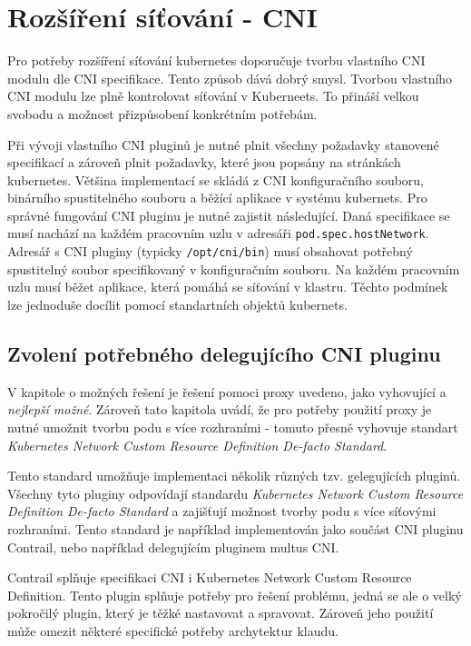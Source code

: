 \section{Rozšíření síťování - CNI}
Pro potřeby rozšíření síťování kubernetes doporučuje tvorbu vlastního CNI modulu dle CNI specifikace. Tento způsob dává dobrý smysl. Tvorbou vlastního CNI modulu lze plně kontrolovat síťování v Kuberneets. To přináší velkou svobodu a možnost přizpůsobení konkrétním potřebám.

Při vývoji vlastního CNI pluginů je nutné plnit všechny požadavky stanovené specifikací a zároveň plnit požadavky, které jsou popsány na stránkách kubernetes. Většina implementací se skládá z CNI konfiguračního souboru, binárního spustitelného souboru a běžící aplikace v systému kubernets. Pro správné fungování CNI pluginu je nutné zajistit následující. Daná specifikace se musí nachází na každém pracovním uzlu v adresáři \verb|pod.spec.hostNetwork|. Adresář s CNI pluginy (typicky \verb|/opt/cni/bin|) musí obsahovat potřebný spustitelný soubor specifikovaný v konfiguračním souboru. Na každém pracovním uzlu musí běžet aplikace, která pomáhá se síťování v klastru. Těchto podmínek lze jednoduše docílit pomocí standartních objektů kubernets. \cite{bigelow_2022_explore}\\

\subsection{Zvolení potřebného delegujícího CNI pluginu}
V kapitole o možných řešení je řešení pomoci proxy uvedeno, jako vyhovující a \textit{nejlepší možné}. Zároveň tato kapitola uvádí, že pro potřeby použití proxy je nutné umožnit tvorbu podu s více rozhraními - tomuto přesně vyhovuje standart \textit{Kubernetes Network Custom Resource Definition De-facto Standard}.

Tento standard umožňuje implementaci několik různých tzv. gelegujících pluginů. Všechny tyto pluginy odpovídají standardu \textit{Kubernetes Network Custom Resource Definition De-facto Standard} a zajišťují možnost tvorby podu s více síťovými rozhraními. Tento standard je například implementován jako součást CNI pluginu Contrail, nebo například delegujícím pluginem multus CNI.

Contrail splňuje specifikaci CNI i Kubernetes Network Custom Resource Definition. Tento plugin splňuje potřeby pro řešení problému, jedná se ale o velký pokročilý plugin, který je těžké nastavovat a spravovat. Zároveň jeho použití může omezit některé specifické potřeby archytektur klaudu.

